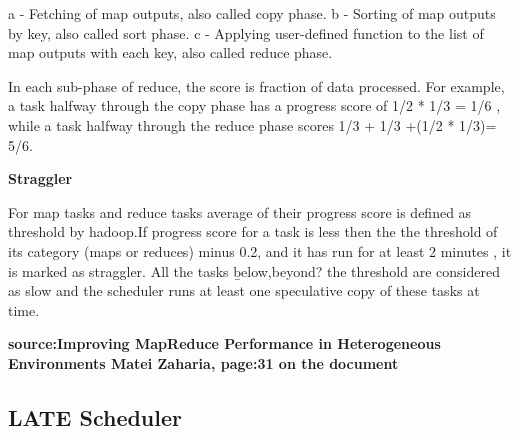 	a - Fetching of map outputs, also called copy phase.
	b - Sorting of map outputs by key, also called sort phase.
	c - Applying user-defined function to the list of map outputs with each key, also called reduce phase. 

In each sub-phase of reduce, the score is fraction of data processed. For example, a task halfway through the copy phase has a progress score of 1/2 * 1/3 = 1/6 , while a task halfway through the reduce phase scores 1/3 + 1/3 +(1/2 * 1/3)= 5/6.

\textbf{Straggler} 

For map tasks and reduce tasks average of their progress score is defined as threshold by hadoop.If progress score for a task is less then the the threshold of its category (maps or reduces) minus 0.2, and it has run for at least 2 minutes , it is marked as straggler. All the tasks \b{below,beyond?} the threshold are considered as slow and the scheduler runs at least one speculative copy of these tasks at time. 
 

\textbf{source:Improving MapReduce Performance in Heterogeneous Environments
Matei Zaharia, page:31 on the document}




\subsection{LATE Scheduler}

